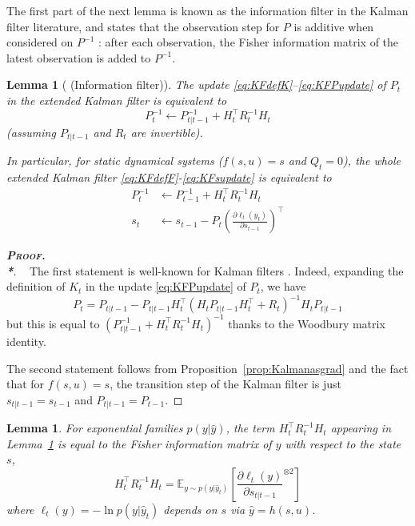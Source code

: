 \documentclass[11pt,a4paper]{article}
\newcommand{\thmheadercommand}[1]{\textbf{\scshape{}#1.\\*}}
\newcommand{\E}{\mathbb{E}}
\newcommand{\1}{\mathbbm{1}}
\newenvironment{dem}[1][]{\begin{proof}[\thmheadercommand{Proof#1}]~\newline\ignorespaces}{\end{proof}}
\theoremstyle{yannthm}
\newtheorem{lem}[defi]{Lemma}
\theoremstyle{yannthm2}
\newcommand{\transp}[1]{#1^{\!\top}\!}
\numberwithin{equation}{section}
\begin{document}
The first part of the next lemma is known as the information filter in the Kalman filter
literature, and states that the observation step for $P$ is additive when
considered on $P^{-1}$ \cite[\S6.2]{simon2006kalmanbook}: after each observation, the Fisher information matrix of
the latest observation is added to $P^{-1}$.

\begin{lem}[ (Information filter)]
\label{lem:infofilter}
The update \eqref{eq:KFdefK}--\eqref{eq:KFPupdate} of $P_t$ in the
extended Kalman filter is equivalent to
\begin{equation}
P_t^{-1} \gets P_{t|t-1}^{-1} + \transp{H_t} R_t^{-1} H_t
\end{equation}
(assuming $P_{t|t-1}$ and $R_t$ are invertible).

In particular, for
static dynamical systems ($f(s,u)=s$ and $Q_t=0$), the
whole extended Kalman filter \eqref{eq:KFdefF}-\eqref{eq:KFsupdate}
is equivalent to
\begin{align}
P_t^{-1} &\gets P_{t-1}^{-1}+\transp{H_t} R_t^{-1} H_t
\\
s_t &\gets s_{t-1} - P_t \transp{\left(\frac{\partial \ell_t(y_t)}{\partial
s_{t-1}}\right)}
\end{align}
\end{lem}

\begin{dem}%
The first statement is well-known for Kalman filters
\cite[(6.33)]{simon2006kalmanbook}. Indeed, expanding
the definition of $K_t$ in the update \eqref{eq:KFPupdate} of $P_t$, we have 
\begin{equation}
P_t=P_{t|t-1}- P_{t|{t-1}}\transp{H_{t}}\left(H_{t} P_{t|{t-1}}
\transp{H_{t}}+R_{t}\right)^{-1} H_t P_{t|t-1}
\end{equation}
but this is equal to 
$(P_{t|t-1}^{-1}+\transp{H_t} R_t^{-1} H_t)^{-1}$
 thanks to the Woodbury matrix identity.

The second statement follows from Proposition~\ref{prop:Kalmanasgrad} and the
fact that for $f(s,u)=s$, the transition step of the Kalman filter is
just $s_{t|t-1}=s_{t-1}$ and $P_{t|t-1}=P_{t-1}$.
\end{dem}

\begin{lem}
\label{lem:hrh}
For
exponential families $p(y|\hat y)$, the term $\transp{H_t} R_t^{-1} H_t$
appearing in Lemma~\ref{lem:infofilter} is
equal to the Fisher information matrix of $y$ with respect to the state
$s$,
\[
\transp{H_t} R_t^{-1} H_t=\E_{y\sim p(y|\hat y_t)}\left[
\frac{
\partial \ell_t(y)}{\partial s_{t|t-1}}^{\otimes 2}
\right]
\]
where $\ell_t(y)=-\ln p(y|\hat y_t)$ depends on $s$ via $\hat y=h(s,u)$.
\end{lem}
\end{document}
